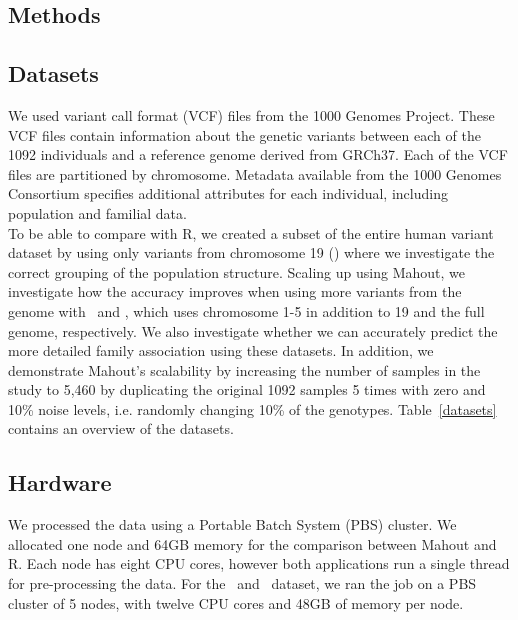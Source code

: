 \documentclass{bioinfo}
\begin{document}
\begin{methods}
\section{Methods}
\subsection*{Datasets}
We used variant call format (VCF) files from the 1000 Genomes Project.
These VCF files contain information about the genetic variants between each of the 1092 individuals and a reference genome derived from GRCh37. 
Each of the VCF files are partitioned by chromosome.
Metadata available from the 1000 Genomes Consortium specifies additional attributes for each individual, including population and familial data.\\
To be able to compare with R, we created a subset of the entire human variant dataset by using only variants from chromosome 19 (\OneReal ) where we investigate the correct grouping of the population structure. 
Scaling up using Mahout, we investigate how the accuracy improves when using more variants from the genome with \SixReal\ and \FullReal, which uses chromosome 1-5 in addition to 19 and the full genome, respectively. 
We also investigate whether we can accurately predict the more detailed family association using these datasets. 
In addition, we demonstrate Mahout's scalability by increasing the number of samples in the study to 5,460 by duplicating the original 1092 samples 5 times with zero and 10\% noise levels, i.e. randomly changing 10\% of the genotypes. 
Table~\ref{datasets} contains an overview of the datasets.

\subsection*{Hardware}
We processed the data using a Portable Batch System (PBS) cluster. We allocated one node and 64GB memory for the comparison between Mahout and R.
Each node has eight CPU cores, however both applications run a single thread for pre-processing the data.
For the \SixReal\ and \FullReal\ dataset, we ran the job on a PBS cluster of 5 nodes, with twelve CPU cores and 48GB of memory per node.


\end{methods}
\end{document}
